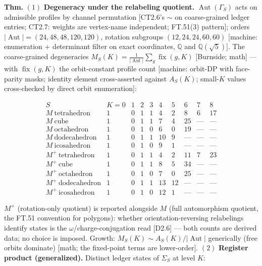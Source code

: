 \begin{theorem}\label{tag:FT-65}
\textbf{Thm.} $(1)$ \textbf{Degeneracy under the relabeling quotient.} $\operatorname{Aut}(\Gamma_S)$ acts on admissible profiles by channel permutation [CT2.6's $\sim$ on coarse-grained ledger entries; CT2.7: weights are vertex-name independent; FT.51(3) pattern]; orders $|\operatorname{Aut}|=(24,48,48,120,120)$, rotation subgroups $(12,24,24,60,60)$ [machine: enumeration + determinant filter on exact coordinates, $\mathbb Q$ and $\mathbb Q(\sqrt5)$]. The coarse-grained degeneracies $M_S(K)=\frac1{|\operatorname{Aut}|}\sum_g\operatorname{fix}(g,K)$ [Burnside; math] — with $\operatorname{fix}(g,K)$ the orbit-constant profile count [machine: orbit-DP with face-parity masks; identity element cross-asserted against $A_S(K)$; small-$K$ values cross-checked by direct orbit enumeration]:

\[
\begin{array}{c|ccccccccc}
S & K{=}0 & 1 & 2 & 3 & 4 & 5 & 6 & 7 & 8\\ \hline
M\ \text{tetrahedron} & 1 & 0 & 1 & 1 & 4 & 2 & 8 & 6 & 17\\
M\ \text{cube} & 1 & 0 & 1 & 1 & 7 & 4 & 25 & — & —\\
M\ \text{octahedron} & 1 & 0 & 1 & 0 & 6 & 0 & 19 & — & —\\
M\ \text{dodecahedron} & 1 & 0 & 1 & 1 & 10 & 9 & — & — & —\\
M\ \text{icosahedron} & 1 & 0 & 1 & 0 & 9 & 1 & — & — & —\\ \hline
M^+\ \text{tetrahedron} & 1 & 0 & 1 & 1 & 4 & 2 & 11 & 7 & 23\\
M^+\ \text{cube} & 1 & 0 & 1 & 1 & 8 & 5 & 34 & — & —\\
M^+\ \text{octahedron} & 1 & 0 & 1 & 0 & 7 & 0 & 25 & — & —\\
M^+\ \text{dodecahedron} & 1 & 0 & 1 & 1 & 13 & 12 & — & — & —\\
M^+\ \text{icosahedron} & 1 & 0 & 1 & 0 & 12 & 1 & — & — & —
\end{array}
\]

$M^+$ (rotation-only quotient) is reported alongside $M$ (full automorphism quotient, the FT.51 convention for polygons): whether orientation-reversing relabelings identify states is the $\omega$/charge-conjugation read [D2.6] — both counts are derived data; no choice is imposed. Growth: $M_S(K)\sim A_S(K)/|\operatorname{Aut}|$ generically (free orbits dominate) [math; the fixed-point terms are lower-order]. $(2)$ \textbf{Register product (generalized).} Distinct ledger states of $\Sigma_S$ at level $K$:


\end{theorem}
